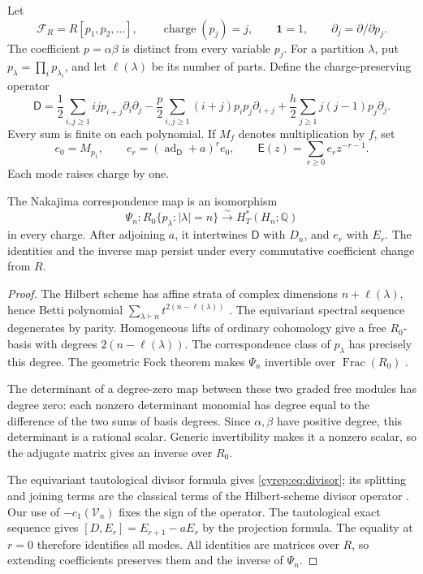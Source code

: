 Let
\[
 \mathcal F_R=R[p_1,p_2,\ldots],\qquad
 \operatorname{charge}(p_j)=j,\qquad \mathbf1=1,
 \qquad \partial_j=\partial/\partial p_j.
\]
The coefficient \(p=\alpha\beta\) is distinct from every variable
\(p_j\). For a partition \(\lambda\), put
\(p_\lambda=\prod_i p_{\lambda_i}\), and let \(\ell(\lambda)\)
be its number of parts. Define the charge-preserving operator
\begin{equation}\label{cyrep:eq:divisor}
 \mathsf D=
 \frac12\sum_{i,j\geq1}ij p_{i+j}\partial_i\partial_j
 -\frac p2\sum_{i,j\geq1}(i+j)p_ip_j\partial_{i+j}
 +\frac h2\sum_{j\geq1}j(j-1)p_j\partial_j.
\end{equation}
Every sum is finite on each polynomial. If \(M_f\) denotes
multiplication by \(f\), set
\begin{equation}\label{cyrep:eq:mode-recursion}
 e_0=M_{p_1},\qquad
 e_r=(\operatorname{ad}_{\mathsf D}+a)^r e_0,\qquad
 \mathsf E(z)=\sum_{r\geq0}e_rz^{-r-1}.
\end{equation}
Each mode raises charge by one.

\begin{theorem}\label{cyrep:thm:lattice}
The Nakajima correspondence map is an isomorphism
\[
 \Psi_n:R_0\{p_\lambda:|\lambda|=n\}
                  \xrightarrow{\ \sim\ }H_T^*(H_n;\mathbb Q)
\]
in every charge. After adjoining \(a\), it intertwines
\(\mathsf D\) with \(D_n\), and \(e_r\) with \(E_r\).
The identities and the inverse map persist under every commutative
coefficient change from \(R\).
\end{theorem}

\begin{proof}
The Hilbert scheme has affine strata of complex dimensions
\(n+\ell(\lambda)\), hence Betti polynomial
\(\sum_{\lambda\vdash n}t^{2(n-\ell(\lambda))}\)
\cite[Theorem 6]{Lederer2014}.
The equivariant spectral sequence degenerates by parity.
Homogeneous lifts of ordinary cohomology give a free \(R_0\)-basis
with degrees \(2(n-\ell(\lambda))\).
The correspondence class of \(p_\lambda\) has precisely this degree.
The geometric Fock theorem makes \(\Psi_n\) invertible over
\(\operatorname{Frac}(R_0)\) \cites{Nakajima97,Nakajima2014}.

The determinant of a degree-zero map between these two graded free
modules has degree zero: each nonzero determinant monomial has degree
equal to the difference of the two sums of basis degrees.
Since \(\alpha,\beta\) have positive degree, this determinant is
a rational scalar. Generic invertibility makes it a nonzero scalar,
so the adjugate matrix gives an inverse over \(R_0\).

The equivariant tautological divisor formula gives
\eqref{cyrep:eq:divisor}; its splitting and joining terms are the
classical terms of the Hilbert-scheme divisor operator
\cite[Section 2.2]{OkounkovPandharipande2004}.
Our use of \(-c_1(\mathcal V_n)\) fixes the sign of the operator.
The tautological exact sequence gives
\([D,E_r]=E_{r+1}-aE_r\) by the projection formula.
The equality at \(r=0\) therefore identifies all modes.
All identities are matrices over \(R\), so extending coefficients
preserves them and the inverse of \(\Psi_n\).
\end{proof}

